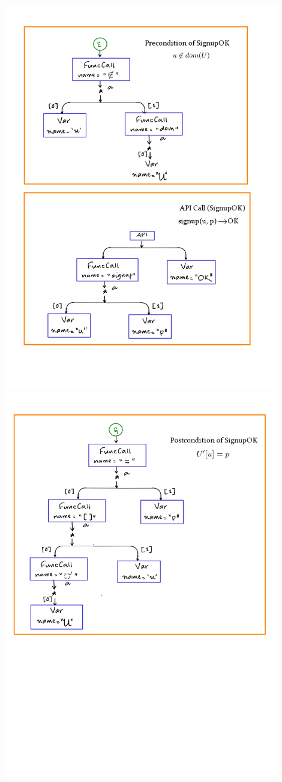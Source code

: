 \documentclass[12pts, a4paper]{article}
\begin{document}
\begin{center}
\includegraphics[width=0.9\textwidth]{images/spec-AST-5.png}
\includegraphics[width=0.9\textwidth]{images/spec-AST-6.png}

\end{center}
\end{document}
